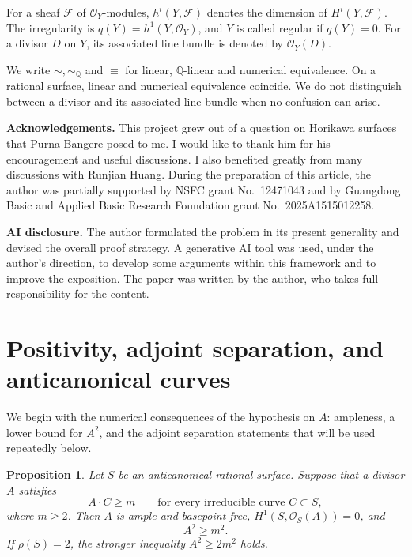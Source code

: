 \documentclass[11pt,reqno]{amsart}
\numberwithin{equation}{section}
\newtheorem{proposition}[proposition]{Proposition}
\theoremstyle{remark}
\newcommand{\sshf}[1]{\mathcal{O}_{#1}}
\newcommand{\shf}[1]{\mathscr{#1}}
\begin{document}
For a
sheaf
\(\shf{F}\) of \(\sshf{Y}\)-modules, \(h^i(Y,\shf{F})\) denotes the
dimension of \(H^i(Y,\shf{F})\). The irregularity is $q(Y)=h^1(Y, \sshf{Y})$, and $Y$ is called regular if $q(Y)=0$. For a divisor \(D\) on \(Y\), its
associated line bundle is denoted by \(\sshf{Y}(D)\).

We write $\sim, \sim_{\mathbb{Q}}$ and $\equiv$ for linear, $\mathbb{Q}$-linear and numerical equivalence. On a rational surface, linear and numerical  equivalence coincide. We do not
distinguish between a divisor and its associated line bundle when no confusion can arise.

\vspace{5pt}

\noindent\textbf{Acknowledgements. }This project grew out of a question
on Horikawa surfaces that Purna Bangere posed to me. I would like to thank him for his encouragement and useful discussions. I also benefited greatly from many discussions with Runjian Huang. During the preparation of this article, the author was partially supported by NSFC grant No.~12471043 and by Guangdong Basic and Applied
Basic Research Foundation grant No.~2025A1515012258. 

\vspace{5pt}

\noindent\textbf{AI disclosure.} 
The author formulated the problem in its present generality and devised the overall proof strategy. A generative AI tool was used, under the author’s direction, to develop some arguments within this framework and to improve the exposition. The paper was written by the author, who takes full responsibility for the content.

\section{Positivity, adjoint separation, and anticanonical curves}\label{sec:positivity}

We begin with the numerical consequences of the hypothesis on \(A\): ampleness, a lower bound for \(A^2\), and the adjoint separation statements that will be used repeatedly below.

\begin{proposition}\label{prop:volume}
Let \(S\) be an anticanonical rational surface.
Suppose that a divisor \(A\) satisfies
\begin{equation}\label{eq:A-m}
  A\cdot C\geq m
  \qquad\text{for every irreducible curve }C\subset S,
\end{equation}
where \(m\geq2\). Then \(A\) is ample and basepoint-free,
\(H^1(S,\sshf{S}(A))=0\), and
\begin{equation}\label{eq:A-square}
  A^2\geq m^2.
\end{equation}
If \(\rho(S)=2\), the stronger inequality \(A^2\geq2m^2\) holds.
\end{proposition}
\end{document}
